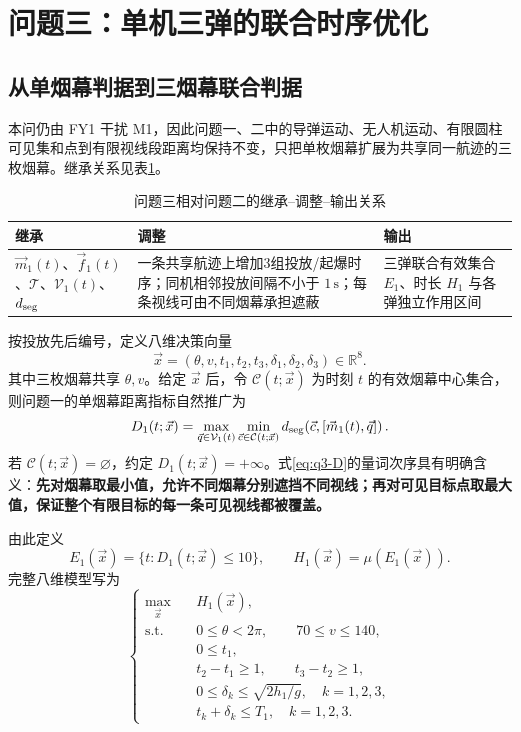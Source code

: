 \section{问题三：单机三弹的联合时序优化}

\subsection{从单烟幕判据到三烟幕联合判据}
本问仍由 FY1 干扰 M1，因此问题一、二中的导弹运动、无人机运动、有限圆柱可见集和点到有限视线段距离均保持不变，只把单枚烟幕扩展为共享同一航迹的三枚烟幕。继承关系见表\ref{tab:q3-inherit}。

\begin{table}[tbp]
\centering
\caption{问题三相对问题二的继承--调整--输出关系}
\label{tab:q3-inherit}
\small
\begin{tabularx}{\textwidth}{p{} X X}
\toprule
\textbf{继承} & \textbf{调整} & \textbf{输出} \\
\midrule
$\vec m_1(t)$、$\vec f_1(t)$、$\mathcal T$、$\mathcal V_1(t)$、$d_{\rm seg}$ & 一条共享航迹上增加3组投放/起爆时序；同机相邻投放间隔不小于 $1\,\mathrm s$；每条视线可由不同烟幕承担遮蔽 & 三弹联合有效集合 $E_1$、时长 $H_1$ 与各弹独立作用区间 \\
\bottomrule
\end{tabularx}
\end{table}

按投放先后编号，定义八维决策向量
\begin{equation}
\vec x=(\theta,v,t_1,t_2,t_3,\delta_1,\delta_2,\delta_3)\in\mathbb R^8.
\label{eq:q3-x}
\end{equation}
其中三枚烟幕共享 $\theta,v$。给定 $\vec x$ 后，令 $\mathcal C(t;\vec x)$ 为时刻 $t$ 的有效烟幕中心集合，则问题一的单烟幕距离指标自然推广为
\begin{equation}
D_1(t;\vec x)=
\max_{\vec q\in\mathcal V_1(t)}
\min_{\vec c\in\mathcal C(t;\vec x)}
 d_{\rm seg}\!\left(\vec c,[\vec m_1(t),\vec q]\right).
\label{eq:q3-D}
\end{equation}
若 $\mathcal C(t;\vec x)=\varnothing$，约定 $D_1(t;\vec x)=+\infty$。式\eqref{eq:q3-D}的量词次序具有明确含义：\textbf{先对烟幕取最小值，允许不同烟幕分别遮挡不同视线；再对可见目标点取最大值，保证整个有限目标的每一条可见视线都被覆盖。}

由此定义
\begin{equation}
E_1(\vec x)=\{t:D_1(t;\vec x)\le10\},
\qquad
H_1(\vec x)=\mu(E_1(\vec x)).
\label{eq:q3-obj}
\end{equation}
完整八维模型写为
\begin{equation}
\left\{
\begin{aligned}
\max_{\vec x}\quad & H_1(\vec x),\\
\text{s.t.}\quad
&0\le\theta<2\pi,\qquad 70\le v\le140,\\
&0\le t_1,\\
&t_2-t_1\ge1,\qquad t_3-t_2\ge1,\\
&0\le\delta_k\le\sqrt{2h_1/g},\quad k=1,2,3,\\
&t_k+\delta_k\le T_1,\quad k=1,2,3.
\end{aligned}
\right.
\label{eq:q3-model}
\end{equation}


